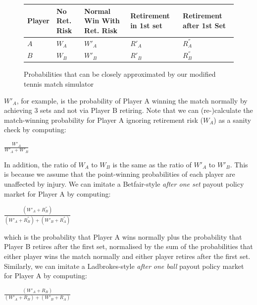 \documentclass[authoryear, 12pt]{elsarticle}
\begin{document}
\begin{figure}[H]
	\begin{center}
	\renewcommand{\arraystretch}{1.8}
		\begin{tabular}{|C{1.2cm}|C{1.4cm}|C{2.8cm}|C{2.4cm}|C{2.4cm}|}
			\hline
			\textbf{Player} & \textbf{No Ret. Risk} & \textbf{Normal Win With Ret. Risk} & \textbf{Retirement in 1st set} & \textbf{Retirement after 1st Set} \\ \hline
			$A$ & $W_A$ & $W'_A$ & $R'_A$ & $R^{''}_A$ \\ \hline
			$B$ & $W_B$ & $W'_B$ & $R'_B$ & $R^{''}_B$ \\ \hline
		\end{tabular}
	\renewcommand{\arraystretch}{1}
	\end{center}
	\caption{Probabilities that can be closely approximated by our modified tennis match simulator}
	\label{outcomes}
\end{figure}

$W'_A$, for example, is the probability of Player A winning the match normally by achieving 3 sets and not via Player B retiring.  Note that we can (re-)calculate the match-winning probability for Player A ignoring retirement risk ($W_A$) as a sanity check by computing:

\begin{center}
	$\frac{W'_A}{W'_A + W'_B}$
\end{center}

In addition, the ratio of $W_A$ to $W_B$ is the same as the ratio of $W'_A$ to $W'_B$.  This is because we assume that the point-winning probabilities of each player are unaffected by injury.  We can imitate a Betfair-style \textit{after one set} payout policy market for Player A by computing:

\begin{center}
	$\frac{(W'_A + R^{''}_B)}{(W'_A + R^{''}_B) + (W'_B + R^{''}_A)}$
\end{center}

which is the probability that Player A wins normally plus the probability that Player B retires after the first set, normalised by the sum of the probabilities that either player wins the match normally and either player retires after the first set.  Similarly, we can imitate a Ladbrokes-style \textit{after one ball} payout policy market for Player A by computing:

\begin{center}
	$\frac{(W'_A + R_B)}{(W'_A + R_B) + (W'_B + R_A)}$
\end{center}
\end{document}
